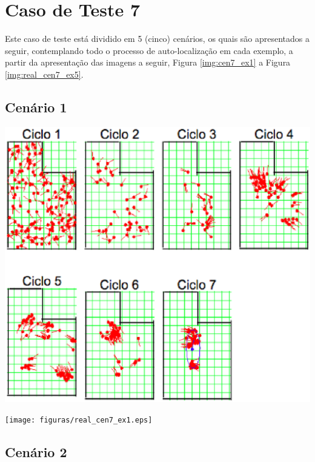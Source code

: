 \section{Caso de Teste 7}
\label{sec:cenario7}

Este caso de teste está dividido em 5 (cinco) cenários, os quais são apresentados a seguir, contemplando todo o processo de auto-localização
em cada exemplo, a partir da apresentação das imagens a seguir, Figura \ref{img:cen7_ex1} a Figura \ref{img:real_cen7_ex5}.

\subsection{Cenário 1}

{\centering
\includegraphics[scale=0.4]{figuras/cen7_ex1.eps}
\label{img:cen7_ex1}
\par}

{\centering
\texttt{[image: figuras/real\_cen7\_ex1.eps]}
\label{img:real_cen7_ex1}
\par}

\subsection{Cenário 2}

